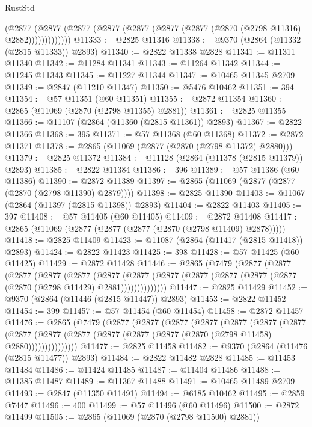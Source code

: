 \begin{lexlean}{RustStd}
\begin{coremodule}
              (@2877
                (@2877 (@2877 (@2877 (@2877 (@2877 (@2877 (@2870 (@2798 @11316) @2882)))))))))))))
@11333 := @2825 @11316
@11338 := @9370 (@2864 (@11332 (@2815 @11333)) @2893)
@11340 := @2822 @11338 @2828
@11341 := @11311 @11340
@11342 := @11284 @11341
@11343 := @11264 @11342
@11344 := @11245 @11343
@11345 := @11227 @11344
@11347 := @10465 @11345 @2709
@11349 := @2847 (@11210 @11347)
@11350 := @5476 @10462
@11351 := 394
@11354 := @57 @11351 (@60 @11351)
@11355 := @2872 @11354
@11360 := @2865 (@11069 (@2870 (@2798 @11355) @2881))
@11361 := @2825 @11355
@11366 := @11107 (@2864 (@11360 (@2815 @11361)) @2893)
@11367 := @2822 @11366
@11368 := 395
@11371 := @57 @11368 (@60 @11368)
@11372 := @2872 @11371
@11378 := @2865 (@11069 (@2877 (@2870 (@2798 @11372) @2880)))
@11379 := @2825 @11372
@11384 := @11128 (@2864 (@11378 (@2815 @11379)) @2893)
@11385 := @2822 @11384
@11386 := 396
@11389 := @57 @11386 (@60 @11386)
@11390 := @2872 @11389
@11397 := @2865 (@11069 (@2877 (@2877 (@2870 (@2798 @11390) @2879))))
@11398 := @2825 @11390
@11403 := @11067 (@2864 (@11397 (@2815 @11398)) @2893)
@11404 := @2822 @11403
@11405 := 397
@11408 := @57 @11405 (@60 @11405)
@11409 := @2872 @11408
@11417 := @2865 (@11069 (@2877 (@2877 (@2877 (@2870 (@2798 @11409) @2878)))))
@11418 := @2825 @11409
@11423 := @11087 (@2864 (@11417 (@2815 @11418)) @2893)
@11424 := @2822 @11423
@11425 := 398
@11428 := @57 @11425 (@60 @11425)
@11429 := @2872 @11428
@11446 := @2865
    (@7479
      (@2877
        (@2877
          (@2877
            (@2877
              (@2877
                (@2877
                  (@2877
                    (@2877 (@2877 (@2877 (@2877 (@2877 (@2870 (@2798 @11429) @2881))))))))))))))
@11447 := @2825 @11429
@11452 := @9370 (@2864 (@11446 (@2815 @11447)) @2893)
@11453 := @2822 @11452
@11454 := 399
@11457 := @57 @11454 (@60 @11454)
@11458 := @2872 @11457
@11476 := @2865
    (@7479
      (@2877
        (@2877
          (@2877
            (@2877
              (@2877
                (@2877
                  (@2877
                    (@2877
                      (@2877 (@2877 (@2877 (@2877 (@2877 (@2870 (@2798 @11458) @2880)))))))))))))))
@11477 := @2825 @11458
@11482 := @9370 (@2864 (@11476 (@2815 @11477)) @2893)
@11484 := @2822 @11482 @2828
@11485 := @11453 @11484
@11486 := @11424 @11485
@11487 := @11404 @11486
@11488 := @11385 @11487
@11489 := @11367 @11488
@11491 := @10465 @11489 @2709
@11493 := @2847 (@11350 @11491)
@11494 := @6185 @10462
@11495 := @2859 @7447
@11496 := 400
@11499 := @57 @11496 (@60 @11496)
@11500 := @2872 @11499
@11505 := @2865 (@11069 (@2870 (@2798 @11500) @2881))

\end{coremodule}
\end{lexlean}
